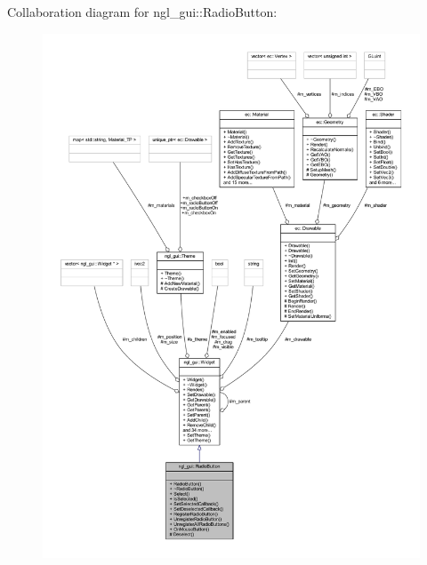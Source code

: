 Collaboration diagram for ngl\+\_\+gui\+:\+:Radio\+Button\+:
\nopagebreak
\begin{figure}[H]
\begin{center}
\leavevmode
\includegraphics[width=350pt]{classngl__gui_1_1_radio_button__coll__graph}
\end{center}
\end{figure}
